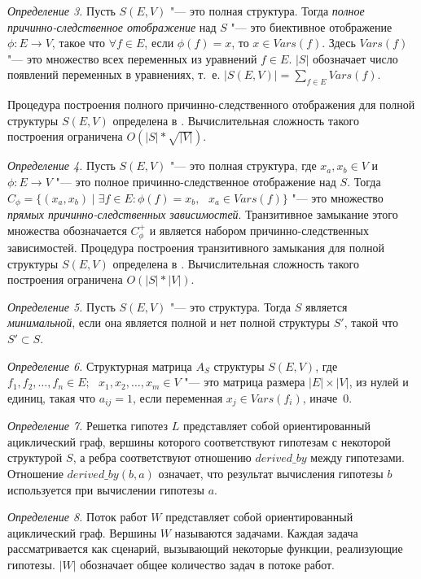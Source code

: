 \textit{Определение 3.} Пусть $S\left( E, V\right)$ "--- это полная структура. Тогда 
\textit{полное причинно-следственное отображение} над $S$ "--- это биективное отображение $\phi: E\to V$, 
такое что $\forall f \in E$, если $\phi \left( f\right) = x$, то $x \in Vars \left( f \right)$. 
Здесь $Vars \left( f \right)$ "--- это множество всех переменных из уравнений $f \in E$. $|S|$ обозначает число 
появлений переменных в уравнениях, т.~е. $|S\left( E, V\right)| = \sum\limits_{f \in E} Vars\left( f\right)$.


Процедура построения полного причинно-следственного отображения для полной структуры $S\left( E, V\right)$ определена 
в \cite{Goncalves2016}. Вычислительная сложность такого построения ограничена $O\left(|S|*\sqrt{|V|}\right)$.

\textit{Определение 4.} Пусть $S\left( E, V\right)$ "--- это полная структура, где $x_a, x_b \in V$ и $\phi: E \to V$ 
"--- это полное причинно-следственное отображение над $S$. Тогда $C_\phi = \{ \left( x_a, x_b \right) \mid 
\exists f \in E: \phi \left( f \right) = x_b, \text{ } x_a \in Vars\left( f \right) \}$ "--- это множество 
\textit{прямых причинно-следственных зависимостей}. Транзитивное замыкание этого множества обозначается 
$C_\phi^+$ и является набором причинно-следственных зависимостей.  Процедура построения транзитивного замыкания 
для полной структуры $S\left( E, V\right)$ определена в \cite{Goncalves2016}. Вычислительная сложность такого 
построения ограничена $O\left(|S|*|V|\right)$. 

\textit{Определение 5.} Пусть $S\left( E, V\right)$ "--- это структура. Тогда $S$ является \textit{минимальной}, 
если она является полной и нет полной структуры $S'$, такой что $S' \subset S$.

\textit{Определение 6.} Структурная матрица $A_S$ структуры $S\left( E, V\right)$, где $f_1, f_2, \ldots, f_n \in E;
\text{ } x_1, x_2, \ldots, x_m \in V$ "--- это матрица размера $|E| \times |V|$, из нулей и единиц, такая что 
$a_{ij} = 1$, если переменная $x_j \in Vars(f_i)$, иначе~$0$.

\textit{Определение 7.} Решетка гипотез $L$ представляет собой ориентированный ациклический граф, вершины которого 
соответствуют гипотезам с некоторой структурой $S$, а ребра соответствуют отношению $derived\_by$  между гипотезами. 
Отношение $derived\_ by\left(b, a\right)$ означает, что результат вычисления гипотезы $b$ используется при вычислении 
гипотезы $a$.

\textit{Определение 8.} Поток работ $W$ представляет собой ориентированный ациклический граф. Вершины $W$ называются 
задачами. Каждая задача рассматривается как сценарий, вызывающий некоторые функции, реализующие гипотезы. $|W|$ 
обозначает общее количество задач в потоке работ.

